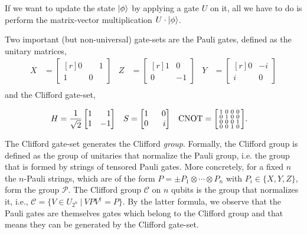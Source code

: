 \documentclass[runningheads]{llncs}
\newenvironment{smallmat}{\left[\begin{smallmatrix}}{\end{smallmatrix}\right]}
\begin{document}
If we want to update the state $\ket{\phi}$ by applying a gate $U$ on it, all we have to do is perform the matrix-vector multiplication $U\cdot \ket{\phi}$.

Two important (but non-universal) gate-sets are the Pauli gates, defined as the unitary matrices,
\begin{align*}
 X &=
    \begin{bmatrix*}[r]
        0 & \phantom-1 \\
        1 & 0
    \end{bmatrix*}&
    Z &=
    \begin{bmatrix*}[r]
        1 & 0 \\
        0 & -1
    \end{bmatrix*}&
    Y &=
    \begin{bmatrix*}[r]
        0 & -i \\
        i & 0
    \end{bmatrix*}\\
    \end{align*}
and the Clifford gate-set,

\begin{align*}
    H &= \frac{1}{\sqrt{2}}
    \begin{bmatrix*}[r]
        1 & 1 \\
        1 & -1
    \end{bmatrix*} &
    S &=
    \begin{bmatrix*}[r]
        1 & 0 \\
        0 & \phantom-i
    \end{bmatrix*}&
    \text{CNOT} &= 
    \begin{smallmat}
    1 & 0 & 0 & 0 \\
    0 & 1 & 0 & 0 \\
    0 & 0 & 0 & 1 \\
    0 & 0 & 1 & 0
    \end{smallmat}.
\end{align*}

The Clifford gate-set generates the Clifford \textit{group}. Formally, the Clifford group is defined as the group of unitaries that normalize the Pauli group, i.e. the group that is formed by strings of tensored Pauli gates. More concretely, for a fixed $n$ the $n$-Pauli strings, which are of the form $P=\pm P_1 \otimes \cdots \otimes P_n$ with $P_i\in \{ X, Y, Z \}$, form the group $\mathcal{P}$. The Clifford group $\mathcal{C}$ on $n$ qubits is the group that normalizes it, i.e., $\mathcal{C}=\{ V\in U_{2^n} \ | \ VPV^{\dagger}=P \}$. By the latter formula, we observe that the Pauli gates are themselves gates which belong to the Clifford group and that means they can be generated by the Clifford gate-set.
\end{document}
